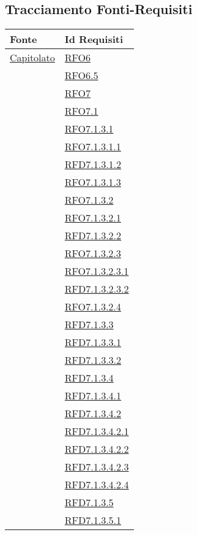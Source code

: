 \subsection{Tracciamento Fonti-Requisiti}
\normalsize
\begin{longtable}{|>{\centering}m{5cm}|m{5cm}<{\centering}|}
\hline 
\textbf{Fonte} & \textbf{Id Requisiti}\\
\hline
\endhead
\hyperlink{Capitolato}{Capitolato} & \hyperlink{RFO6}{RFO6}\\
& \hyperlink{RFO6.5}{RFO6.5}\\
& \hyperlink{RFO7}{RFO7}\\
& \hyperlink{RFO7.1}{RFO7.1}\\
& \hyperlink{RFO7.1.3.1}{RFO7.1.3.1}\\
& \hyperlink{RFO7.1.3.1.1}{RFO7.1.3.1.1}\\
& \hyperlink{RFD7.1.3.1.2}{RFD7.1.3.1.2}\\
& \hyperlink{RFO7.1.3.1.3}{RFO7.1.3.1.3}\\
& \hyperlink{RFO7.1.3.2}{RFO7.1.3.2}\\
& \hyperlink{RFO7.1.3.2.1}{RFO7.1.3.2.1}\\
& \hyperlink{RFD7.1.3.2.2}{RFD7.1.3.2.2}\\
& \hyperlink{RFO7.1.3.2.3}{RFO7.1.3.2.3}\\
& \hyperlink{RFO7.1.3.2.3.1}{RFO7.1.3.2.3.1}\\
& \hyperlink{RFD7.1.3.2.3.2}{RFD7.1.3.2.3.2}\\
& \hyperlink{RFO7.1.3.2.4}{RFO7.1.3.2.4}\\
& \hyperlink{RFD7.1.3.3}{RFD7.1.3.3}\\
& \hyperlink{RFD7.1.3.3.1}{RFD7.1.3.3.1}\\
& \hyperlink{RFD7.1.3.3.2}{RFD7.1.3.3.2}\\
& \hyperlink{RFD7.1.3.4}{RFD7.1.3.4}\\
& \hyperlink{RFD7.1.3.4.1}{RFD7.1.3.4.1}\\
& \hyperlink{RFD7.1.3.4.2}{RFD7.1.3.4.2}\\
& \hyperlink{RFD7.1.3.4.2.1}{RFD7.1.3.4.2.1}\\
& \hyperlink{RFD7.1.3.4.2.2}{RFD7.1.3.4.2.2}\\
& \hyperlink{RFD7.1.3.4.2.3}{RFD7.1.3.4.2.3}\\
& \hyperlink{RFD7.1.3.4.2.4}{RFD7.1.3.4.2.4}\\
& \hyperlink{RFD7.1.3.5}{RFD7.1.3.5}\\
& \hyperlink{RFD7.1.3.5.1}{RFD7.1.3.5.1}\\

\end{longtable}
